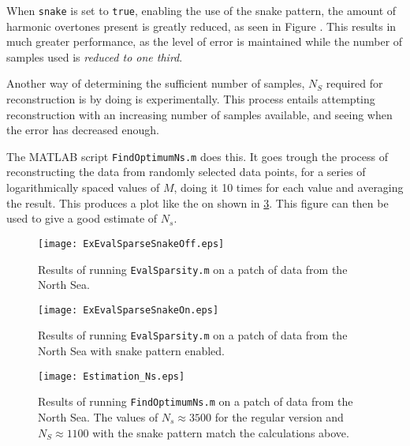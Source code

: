\documentclass[Main]{subfiles}
\begin{document}
		When \texttt{snake} is set to \texttt{true}, enabling the use of the snake pattern, the amount of harmonic overtones present is greatly reduced, as seen in Figure .
		This results in much greater performance, as the level of error is maintained while the number of samples used is \emph{reduced to one third}. 

		Another way of determining the sufficient number of samples, $N_S$ required for reconstruction is by doing is experimentally.
		This process entails attempting reconstruction with an increasing number of samples available, and seeing when the error has decreased enough.

		The MATLAB script \texttt{FindOptimumNs.m} does this.
		It goes trough the process of reconstructing the data from randomly selected data points, for a series of logarithmically spaced values of $M$, doing it 10 times for each value and averaging the result.
		This produces a plot like the on shown in \ref{fig:Estimation_Ns}.
		This figure can then be used to give a good estimate of $N_s$.

		\begin{figure}[H]
			\centering 
			\texttt{[image: ExEvalSparseSnakeOff.eps]}
			\caption{
				Results of running \texttt{EvalSparsity.m} on a patch of data from the North Sea.}
			\label{fig:ExEvalSparseSnakeOff}
		\end{figure}

		\begin{figure}[H]
			\centering 
			\texttt{[image: ExEvalSparseSnakeOn.eps]}
			\caption{
				Results of running \texttt{EvalSparsity.m} on a patch of data from the North Sea with snake pattern enabled.}
			\label{fig:ExEvalSparseSnakeOff}
		\end{figure}

		\begin{figure}[H]
			\centering 
			\texttt{[image: Estimation\_Ns.eps]}
			\caption{
				Results of running \texttt{FindOptimumNs.m} on a patch of data from the North Sea. The values of $N_s \approx 3500$ for the regular version and $N_S \approx 1100$ with the snake pattern match the calculations above.}
			\label{fig:Estimation_Ns}
		\end{figure}
\end{document}
